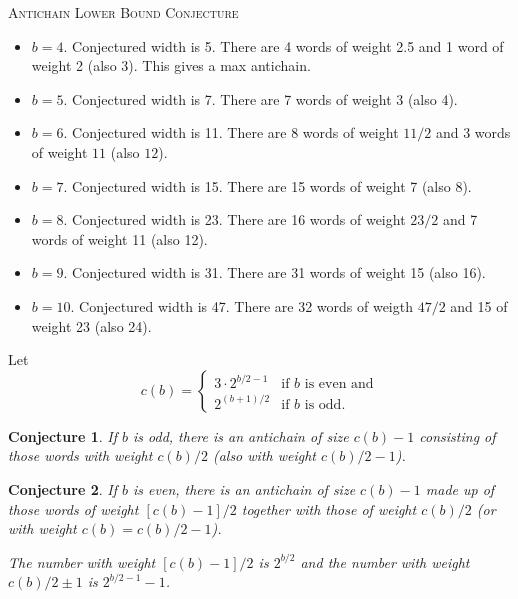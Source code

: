 \documentclass[12pt]{article}
\newtheorem{conj}{Conjecture}
\begin{document}
\begin{center}
  \textsc{\large
    Antichain Lower Bound Conjecture
  }
\end{center}

\begin{itemize}
\item $b=4$. Conjectured width is 5.  There are 4 words
  of weight 2.5 and 1 word of weight 2 (also 3). This gives a max antichain.


\item $b=5$. Conjectured width is 7.  There are 7 words of weight 3
  (also 4). 

\item $b=6$. Conjectured width is 11. There are 8 words of weight $11/2$
  and 3 words of weight $11$ (also $12$).

\item $b=7$. Conjectured width is 15. There are 15 words of weight 7
  (also 8). 

\item $b=8$. Conjectured width is 23. There are 16 words of weight
  $23/2$ and 7 words of weight 11 (also 12).

\item $b=9$. Conjectured width is 31. There are 31 words of weight 15
  (also 16).

\item $b=10$. Conjectured width is 47. There are 32 words of weigth
  $47/2$ and 15 of weight 23 (also 24). 
\end{itemize}



Let 
\[
c(b) = 
\begin{cases}
  3\cdot 2^{b/2-1} & \text{if $b$ is even and} \\
  2^{(b+1)/2} & \text{if $b$ is odd}.
\end{cases}
\]


\begin{conj}
  If $b$ is odd, there is an antichain of size $c(b)-1$
  consisting of those words with weight $c(b)/2$ (also with weight $c(b)/2-1$).
\end{conj}

\begin{conj}
  If $b$ is even, there is an antichain of size
  $c(b)-1$ made up of those words of weight $[c(b)-1]/2$ together with
  those of weight $c(b)/2$ (or with weight $c(b)=c(b)/2-1$).

  The number with weight $[c(b)-1]/2$ is $2^{b/2}$ and the number with
  weight $c(b)/2\pm1$ is $2^{b/2-1}-1$. 
\end{conj}
\end{document}
